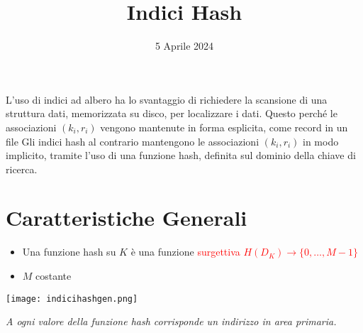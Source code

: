 \documentclass[12pt]{article}
\title{Indici Hash}
\date{5 Aprile 2024}
\begin{document}
\maketitle
L’uso di indici ad albero ha lo svantaggio di richiedere la scansione di una struttura dati, memorizzata su disco, per localizzare i dati. Questo perché le associazioni $(k_{i}, r_{i})$ vengono mantenute in forma esplicita, come record in un file Gli indici hash al contrario mantengono le associazioni $(k_{i}, r_{i})$ in modo implicito, tramite l’uso di una funzione hash, definita sul dominio della chiave di ricerca.
\section{Caratteristiche Generali}
\begin{itemize}
    \item Una funzione hash su $K$ è una funzione \textcolor{red}{surgettiva $H(D_{K})\rightarrow\{0,\dots,M-1\}$}
    \item $M$ costante
\end{itemize}
\begin{center}
    \texttt{[image: indicihashgen.png]}
\end{center}
\textit{A ogni valore della funzione hash corrisponde un indirizzo in area primaria.}\newpage
\end{document}
